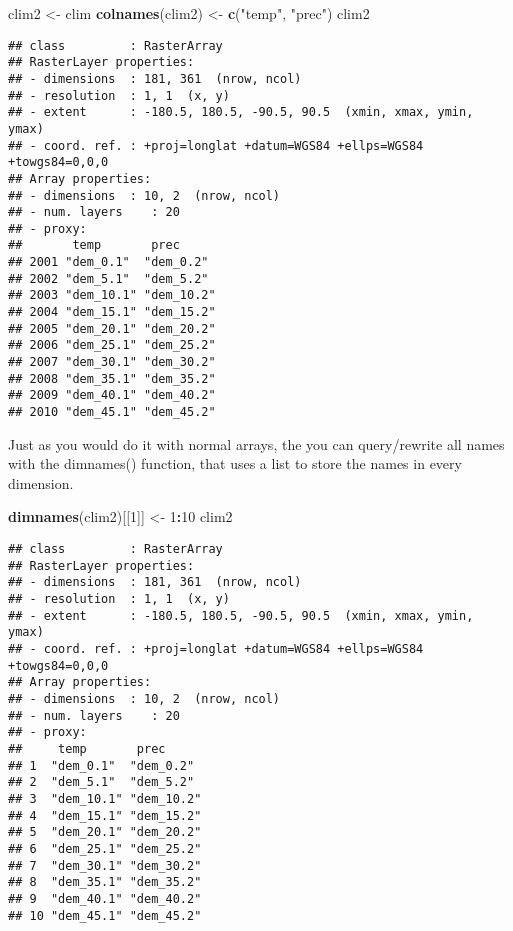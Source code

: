 \documentclass[]{article}
\newenvironment{Shaded}{\begin{snugshade}}{\end{snugshade}}
\newcommand{\DecValTok}[1]{\textcolor[rgb]{0.00,0.00,0.81}{#1}}
\newcommand{\KeywordTok}[1]{\textcolor[rgb]{0.13,0.29,0.53}{\textbf{#1}}}
\newcommand{\NormalTok}[1]{#1}
\newcommand{\OperatorTok}[1]{\textcolor[rgb]{0.81,0.36,0.00}{\textbf{#1}}}
\newcommand{\StringTok}[1]{\textcolor[rgb]{0.31,0.60,0.02}{#1}}
\begin{document}
\begin{Shaded}
\begin{Highlighting}[]
\NormalTok{clim2 <-}\StringTok{ }\NormalTok{clim}
\KeywordTok{colnames}\NormalTok{(clim2) <-}\StringTok{ }\KeywordTok{c}\NormalTok{(}\StringTok{"temp"}\NormalTok{, }\StringTok{"prec"}\NormalTok{)}
\NormalTok{clim2}
\end{Highlighting}
\end{Shaded}

\begin{verbatim}
## class         : RasterArray 
## RasterLayer properties: 
## - dimensions  : 181, 361  (nrow, ncol)
## - resolution  : 1, 1  (x, y)
## - extent      : -180.5, 180.5, -90.5, 90.5  (xmin, xmax, ymin, ymax)
## - coord. ref. : +proj=longlat +datum=WGS84 +ellps=WGS84 +towgs84=0,0,0 
## Array properties: 
## - dimensions  : 10, 2  (nrow, ncol)
## - num. layers    : 20
## - proxy:
##       temp       prec      
## 2001 "dem_0.1"  "dem_0.2" 
## 2002 "dem_5.1"  "dem_5.2" 
## 2003 "dem_10.1" "dem_10.2"
## 2004 "dem_15.1" "dem_15.2"
## 2005 "dem_20.1" "dem_20.2"
## 2006 "dem_25.1" "dem_25.2"
## 2007 "dem_30.1" "dem_30.2"
## 2008 "dem_35.1" "dem_35.2"
## 2009 "dem_40.1" "dem_40.2"
## 2010 "dem_45.1" "dem_45.2"
\end{verbatim}

Just as you would do it with normal arrays, the you can query/rewrite
all names with the dimnames() function, that uses a list to store the
names in every dimension.

\begin{Shaded}
\begin{Highlighting}[]
\KeywordTok{dimnames}\NormalTok{(clim2)[[}\DecValTok{1}\NormalTok{]] <-}\StringTok{ }\DecValTok{1}\OperatorTok{:}\DecValTok{10}
\NormalTok{clim2}
\end{Highlighting}
\end{Shaded}

\begin{verbatim}
## class         : RasterArray 
## RasterLayer properties: 
## - dimensions  : 181, 361  (nrow, ncol)
## - resolution  : 1, 1  (x, y)
## - extent      : -180.5, 180.5, -90.5, 90.5  (xmin, xmax, ymin, ymax)
## - coord. ref. : +proj=longlat +datum=WGS84 +ellps=WGS84 +towgs84=0,0,0 
## Array properties: 
## - dimensions  : 10, 2  (nrow, ncol)
## - num. layers    : 20
## - proxy:
##     temp       prec      
## 1  "dem_0.1"  "dem_0.2" 
## 2  "dem_5.1"  "dem_5.2" 
## 3  "dem_10.1" "dem_10.2"
## 4  "dem_15.1" "dem_15.2"
## 5  "dem_20.1" "dem_20.2"
## 6  "dem_25.1" "dem_25.2"
## 7  "dem_30.1" "dem_30.2"
## 8  "dem_35.1" "dem_35.2"
## 9  "dem_40.1" "dem_40.2"
## 10 "dem_45.1" "dem_45.2"
\end{verbatim}
\end{document}
